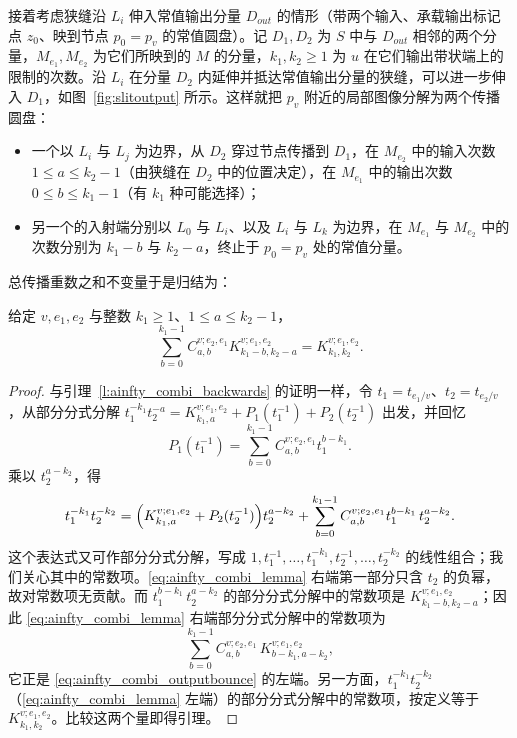 接着考虑狭缝沿 $L_i$ 伸入常值输出分量 $D_{out}$ 的情形（带两个输入、承载输出标记点 $z_0$、映到节点 $p_0=p_v$ 的常值圆盘）。记 $D_1,D_2$ 为 $S$ 中与 $D_{out}$ 相邻的两个分量，$M_{e_1},M_{e_2}$ 为它们所映到的 $M$ 的分量，$k_1,k_2\geq 1$ 为 $u$ 在它们输出带状端上的限制的次数。沿 $L_i$ 在分量 $D_2$ 内延伸并抵达常值输出分量的狭缝，可以进一步伸入 $D_1$，如图~\ref{fig:slitoutput} 所示。这样就把 $p_v$ 附近的局部图像分解为两个传播圆盘：
\begin{itemize}
\item 一个以 $L_i$ 与 $L_j$ 为边界，从 $D_2$ 穿过节点传播到 $D_1$，在 $M_{e_2}$ 中的输入次数 $1\leq a\leq k_2-1$（由狭缝在 $D_2$ 中的位置决定），在 $M_{e_1}$ 中的输出次数 $0\leq b\leq k_1-1$（有 $k_1$ 种可能选择）；
\item 另一个的入射端分别以 $L_0$ 与 $L_i$、以及 $L_i$ 与 $L_k$ 为边界，在 $M_{e_1}$ 与 $M_{e_2}$ 中的次数分别为 $k_1-b$ 与 $k_2-a$，终止于 $p_0=p_v$ 处的常值分量。
\end{itemize}
总传播重数之和不变量于是归结为：

\begin{lemma}\label{l:ainfty_combi_outputbounce}
给定 $v,e_1,e_2$ 与整数 $k_1\geq 1$、$1\leq a\leq k_2-1$，
\begin{equation}\label{eq:ainfty_combi_outputbounce}
\sum_{b=0}^{k_1-1} C_{a,b}^{v;e_2,e_1} K_{k_1-b,k_2-a}^{v;e_1,e_2}=
K_{k_1,k_2}^{v;e_1,e_2}.
\end{equation}
\end{lemma}

\begin{proof}
与引理~\ref{l:ainfty_combi_backwards} 的证明一样，令 $t_1=t_{e_1/v}$、$t_2=t_{e_2/v}$，从部分分式分解 $t_1^{-k_1}t_2^{-a}=K_{k_1,a}^{v;e_1,e_2}+P_1(t_1^{-1})+P_2(t_2^{-1})$ 出发，并回忆
\[
P_1(t_1^{-1})=\sum_{b=0}^{k_1-1} C_{a,b}^{v;e_2,e_1} t_1^{b-k_1}.
\]
乘以 $t_2^{a-k_2}$，得
\begin{equation}\label{eq:ainfty_combi_lemma}
t_1^{-k_1}t_2^{-k_2}=\Bigl(K_{k_1,a}^{v;e_1,e_2}+P_2(t_2^{-1})\Bigr) t_2^{a-k_2}+
\sum_{b=0}^{k_1-1} C_{a,b}^{v;e_2,e_1} t_1^{b-k_1}\,t_2^{a-k_2}.
\end{equation}
这个表达式又可作部分分式分解，写成 $1,t_1^{-1},\dots,t_1^{-k_1},t_2^{-1},\dots,t_2^{-k_2}$ 的线性组合；我们关心其中的常数项。\eqref{eq:ainfty_combi_lemma} 右端第一部分只含 $t_2$ 的负幂，故对常数项无贡献。而 $t_1^{b-k_1}\,t_2^{a-k_2}$ 的部分分式分解中的常数项是 $K_{k_1-b,k_2-a}^{v;e_1,e_2}$；因此 \eqref{eq:ainfty_combi_lemma} 右端部分分式分解中的常数项为
\[
\sum_{b=0}^{k_1-1} C_{a,b}^{v;e_2,e_1}\,K_{b-k_1,a-k_2}^{v;e_1,e_2},
\]
它正是 \eqref{eq:ainfty_combi_outputbounce} 的左端。另一方面，$t_1^{-k_1}t_2^{-k_2}$（\eqref{eq:ainfty_combi_lemma} 左端）的部分分式分解中的常数项，按定义等于 $K_{k_1,k_2}^{v;e_1,e_2}$。比较这两个量即得引理。
\end{proof}

